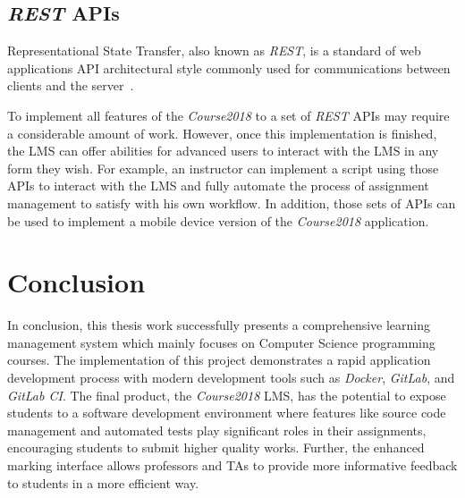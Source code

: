 \subsection{\emph{REST} APIs}
Representational State Transfer, also known as \emph{REST}, is a standard of
web applications API architectural style commonly used for communications
between clients and the server~\citep[Chapter 5]{REST}.

To implement all features of the \emph{Course2018} to a set of \emph{REST} APIs
may require a considerable amount of work. However, once this implementation is
finished, the LMS can offer abilities for advanced users to interact with the
LMS in any form they
wish. For example, an instructor can implement a script using those APIs to
interact with the LMS and fully automate the process of assignment management
to satisfy with his own workflow. In addition, those sets of APIs can be used
to implement a mobile device version of the \emph{Course2018} application.


\section{Conclusion}
In conclusion, this thesis work successfully presents a comprehensive
learning management system which mainly focuses on Computer Science
programming courses. The implementation of this project demonstrates
a rapid application development process with modern development tools
such as \emph{Docker}, \emph{GitLab}, and \emph{GitLab CI}.
The final product, the \emph{Course2018} LMS, has the potential to expose
students to a software development environment where features like source
code management and
automated tests play significant roles in their assignments, encouraging
students to submit higher quality works.
Further,
the enhanced marking interface allows professors and TAs to provide more
informative feedback to students in a more efficient way.
